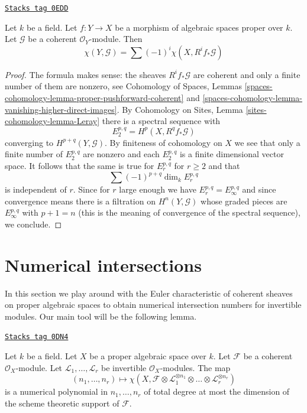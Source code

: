 \begin{lemma}
\label{spaces-over-fields-lemma-euler-characteristic-morphism}
\href{https://stacks.math.columbia.edu/tag/0EDD}{\texttt{Stacks tag 0EDD}}

Let $k$ be a field. Let $f : Y \to X$ be a morphism of
algebraic spaces proper over $k$. Let $\mathcal{G}$ be a
coherent $\mathcal{O}_Y$-module. Then
$$
\chi(Y, \mathcal{G}) = \sum (-1)^i \chi(X, R^if_*\mathcal{G})
$$
\end{lemma}

\begin{proof}
The formula makes sense: the sheaves $R^if_*\mathcal{G}$ are coherent
and only a finite number of them are nonzero, see
Cohomology of Spaces, Lemmas
\ref{spaces-cohomology-lemma-proper-pushforward-coherent} and
\ref{spaces-cohomology-lemma-vanishing-higher-direct-images}.
By Cohomology on Sites, Lemma \ref{sites-cohomology-lemma-Leray}
there is a spectral sequence with
$$
E_2^{p, q} = H^p(X, R^qf_*\mathcal{G})
$$
converging to $H^{p + q}(Y, \mathcal{G})$. By finiteness of cohomology
on $X$ we see that only a finite number of $E_2^{p, q}$ are nonzero
and each $E_2^{p, q}$ is a finite dimensional vector space. It follows
that the same is true for $E_r^{p, q}$ for $r \geq 2$ and that
$$
\sum (-1)^{p + q} \dim_k E_r^{p, q}
$$
is independent of $r$. Since for $r$ large enough we have
$E_r^{p, q} = E_\infty^{p, q}$ and since convergence means there
is a filtration on $H^n(Y, \mathcal{G})$ whose graded pieces are
$E_\infty^{p, q}$ with $p + 1 = n$ (this is the meaning of convergence
of the spectral sequence), we conclude.
\end{proof}

\section{Numerical intersections}
\label{spaces-over-fields-section-num}
In this section we play around with the Euler characteristic of
coherent sheaves on proper algebraic spaces to obtain numerical intersection
numbers for invertible modules. Our main tool will be the following
lemma.

\begin{lemma}
\label{spaces-over-fields-lemma-numerical-polynomial-from-euler}
\href{https://stacks.math.columbia.edu/tag/0DN4}{\texttt{Stacks tag 0DN4}}

Let $k$ be a field. Let $X$ be a proper algebraic space over $k$.
Let $\mathcal{F}$ be a coherent $\mathcal{O}_X$-module. Let
$\mathcal{L}_1, \ldots, \mathcal{L}_r$ be invertible $\mathcal{O}_X$-modules.
The map
$$
(n_1, \ldots, n_r) \longmapsto
\chi(X, \mathcal{F} \otimes
\mathcal{L}_1^{\otimes n_1} \otimes \ldots \otimes
\mathcal{L}_r^{\otimes n_r})
$$
is a numerical polynomial in $n_1, \ldots, n_r$ of total degree at
most the dimension of the scheme theoretic support of $\mathcal{F}$.
\end{lemma}

